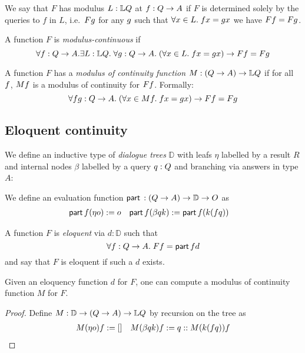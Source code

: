 \documentclass[a4paper,UKenglish,cleveref, autoref, thm-restate]{lipics-v2021}
\begin{document}
We say that $F$  
has modulus $L \of \List Q$
at $\f : Q \to A$
if
$F$ is determined solely by the queries to $f$ in $L$,
i.e.\ $F \g$ for any $\g$ such that $\forall x \in L.\;  \f x = \g x$ we have $F \f = F \g$.

A function $F$ is \textit{modulus-continuous} if 
\[ \forall \f \of Q \to A.\exists L \of \List Q.\; \forall \g \of Q \to A.\; (\forall x \in L.\;f x = g x) \to F \f = F \g \]

A function $F$ has a
\textit{modulus of continuity function} $M \of (Q \to A) \to \List Q$ if
for all $\f$, $M \f$ is a modulus of continuity for $F \f$.
Formally:
\[ \forall \f \g \of Q \to A.\; (\forall x \in M \f.\;\f x = \g x) \to F \f = F \g \]

\subsection{Eloquent continuity}

We define an inductive type of \textit{dialogue trees} $\mathbb{D}$ with leafs $\eta$ labelled by a result $R$
and internal nodes $\beta$ labelled by a query $q \of Q$ and branching via answers in type $A$:
\begin{mathpar}

\end{mathpar}

We define an evaluation function $\eval \of {(Q \to A) \to \mathbb{D} \to O}$ as
\begin{align*}
  &\eval \f (\eta o) := o && \eval \f (\beta q k) := \eval \f (k (\f q))
\end{align*}

A function $F$ is \textit{eloquent} via $d : \mathbb{D}$ such that
\[ \forall \f \of Q \to A.\;F \f = \eval \f d \]
and say that $F$ is eloquent if such a $d$ exists.

\begin{lemma}
  Given an eloquency function $d$ for $F$, one can compute a modulus of continuity function $M$ for $F$.
\end{lemma}
\begin{proof}
  Define $M \of {\mathbb{D} \to (Q \to A) \to \List Q}$ by recursion on the tree as
  \begin{align*}
    M (\eta o) \f := [] && M (\beta qk) \f := q :: M (k (f q)) \f 
  \end{align*}
\end{proof}
\end{document}
